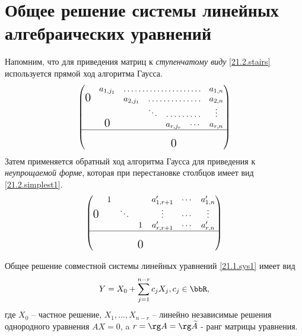 \section{Общее решение системы линейных алгебраических уравнений}
  Напомним, что для приведения матриц к \textit{ступенчатому виду} \eqref{21.2.stairs} используется прямой ход алгоритма Гаусса. 
  \begin{equation}\label{21.2.stairs} 
  \begin{pmatrix}
      &a_{1,j_1}& \hdotsfor{4}          &a_{1,n}     \cr 
 \fudge 0&&a_{2,j_1} &\hdotsfor{3}      &a_{2,n}     \cr
      &   &     &\ddots&\hdotsfor{2}    &\vdots      \cr 
      &\fudge 0 && & a_{r,j_r}  &\cdots &a_{r,n}   \cr \hline
      &   &     &  &            &       &         \cr
      &   &     &  &\fudge 0    &       &         \cr
  \end{pmatrix}
  \end{equation}    
  Затем применяется обратный ход алгоритма Гаусса для приведения к \textit{неупрощаемой форме}, которая при перестановке столбцов имеет вид \eqref{21.2.simplest1}.
  \begin{equation}\label{21.2.simplest1}
  \begin{pmatrix}
      & 1 &     &   &a'_{1,r+1} &\cdots &a'_{1,n}   \cr 
    \smash{\hbox{\Large0}} & &\ddots& &\vdots &\cdots &\vdots     \cr
      &   &     & 1 &a'_{r,r+1} &\cdots &a'_{r,n}   \cr \hline
      &   &     &   &           &       &           \cr
      &   & &\smash{\hbox{\Large0}}  &        &       &           \cr
  \end{pmatrix}
  \end{equation}    
  \begin{thm}\label{21.2.th.common}
  Общее решение совместной системы линейных уравнений \eqref{21.1.sys1} имеет вид 
  \begin{equation}\label{21.2.common}
   Y=X_0+\sum_{j=1}^{n-r}c_jX_j, c_j \in \bbR,
  \end{equation}
  где $X_0$ -- частное решение, $X_1,...,X_{n-r}$ -- линейно независимые решения однородного уравнения $AX=0$, a $r=\rg A=\rg \widetilde A$ - ранг матрицы уравнения.
  \end{thm}
